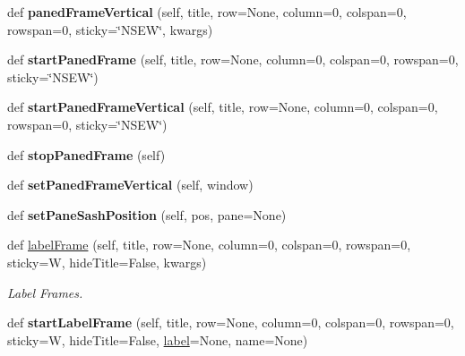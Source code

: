 \begin{DoxyCompactItemize}
def {\bfseries paned\+Frame\+Vertical} (self, title, row=None, column=0, colspan=0, rowspan=0, sticky=\char`\"{}N\+S\+EW\char`\"{}, kwargs)
\item 
\mbox{\label{class_python_01_g_u_i_1_1appjar_1_1gui_ab6cb3ee2affb62e5551577d902d54eb2}} 
def {\bfseries start\+Paned\+Frame} (self, title, row=None, column=0, colspan=0, rowspan=0, sticky=\char`\"{}N\+S\+EW\char`\"{})
\item 
\mbox{\label{class_python_01_g_u_i_1_1appjar_1_1gui_aabad168370964ce87699a40b6bfd8e30}} 
def {\bfseries start\+Paned\+Frame\+Vertical} (self, title, row=None, column=0, colspan=0, rowspan=0, sticky=\char`\"{}N\+S\+EW\char`\"{})
\item 
\mbox{\label{class_python_01_g_u_i_1_1appjar_1_1gui_a2b4bfafbbfb042d8f23a00cc41c7166f}} 
def {\bfseries stop\+Paned\+Frame} (self)
\item 
\mbox{\label{class_python_01_g_u_i_1_1appjar_1_1gui_af681f49eadf618b14b37a9f5521866b9}} 
def {\bfseries set\+Paned\+Frame\+Vertical} (self, window)
\item 
\mbox{\label{class_python_01_g_u_i_1_1appjar_1_1gui_a7ffaf2116ca07cf18dd11dcc72c84433}} 
def {\bfseries set\+Pane\+Sash\+Position} (self, pos, pane=None)
\item 
\mbox{\label{class_python_01_g_u_i_1_1appjar_1_1gui_aa7caa49d1478b546ab1098508b9f0a2d}} 
def \hyperlink{class_python_01_g_u_i_1_1appjar_1_1gui_aa7caa49d1478b546ab1098508b9f0a2d}{label\+Frame} (self, title, row=None, column=0, colspan=0, rowspan=0, sticky=W, hide\+Title=False, kwargs)
\begin{DoxyCompactList}\small\item\em Label Frames. \end{DoxyCompactList}\item 
\mbox{\label{class_python_01_g_u_i_1_1appjar_1_1gui_ad082c2db223549ee5ec7434548f0d909}} 
def {\bfseries start\+Label\+Frame} (self, title, row=None, column=0, colspan=0, rowspan=0, sticky=W, hide\+Title=False, \hyperlink{class_python_01_g_u_i_1_1appjar_1_1gui_a899e593dca96dd2a31035558b685e3bd}{label}=None, name=None)

\end{DoxyCompactItemize}
